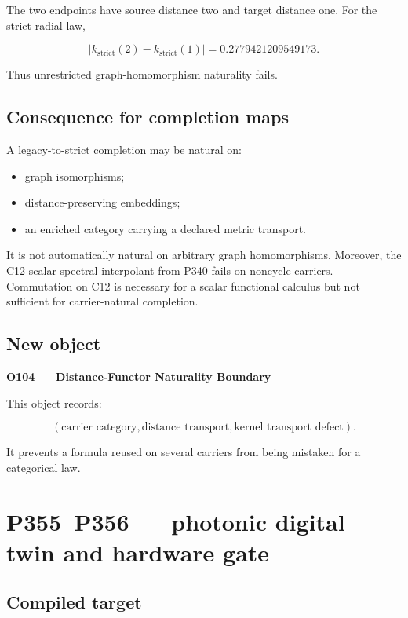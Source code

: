 \documentclass[11pt,a4paper,openany]{report}
\begin{document}
The two endpoints have source distance two and target distance one. For the strict radial law,

\[
|k_{\mathrm{strict}}(2)-k_{\mathrm{strict}}(1)|
=0.2779421209549173.
\]

Thus unrestricted graph-homomorphism naturality fails.

\section{Consequence for completion maps}

A legacy-to-strict completion may be natural on:

\begin{itemize}
\item 
graph isomorphisms;

\item 
distance-preserving embeddings;

\item 
an enriched category carrying a declared metric transport.

\end{itemize}

It is not automatically natural on arbitrary graph homomorphisms. Moreover, the C12 scalar spectral interpolant from P340 fails on noncycle carriers. Commutation on C12 is necessary for a scalar functional calculus but not sufficient for carrier-natural completion.

\section{New object}

\textbf{O104 --- Distance-Functor Naturality Boundary}

This object records:

\[
(\text{carrier category},
\text{distance transport},
\text{kernel transport defect}).
\]

It prevents a formula reused on several carriers from being mistaken for a categorical law.

\chapter{P355--P356 --- photonic digital twin and hardware gate}

\section{Compiled target}
\end{document}
